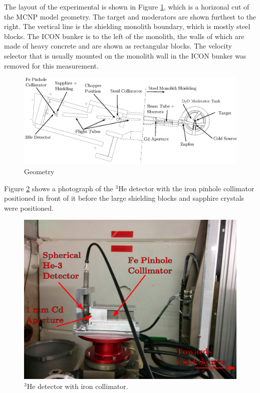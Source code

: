 \documentclass[preprint,12pt]{elsarticle}
\begin{document}
The layout of the experimental is shown in Figure \ref{fig:geom}, which is a horizonal cut of the MCNP model geometry.  The target and moderators are shown furthest to the right.  The vertical line is the shielding monolith boundary, which is mostly steel blocks.  The ICON bunker is to the left of the monolith, the walls of which are made of heavy concrete and are shown as rectangular blocks.  The velocity selector that is usually mounted on the monolith wall in the ICON bunker was removed for this measurement.

\begin{figure}[h!] 
  \centering
    \includegraphics[width=\columnwidth]{graphics/geom_bw_labels.eps}
     \caption{Geometry \label{fig:geom} }
\end{figure}

Figure \ref{fig:det} shows a photograph of the $^3$He detector with the iron pinhole collimator positioned in front of it before the large shielding blocks and sapphire crystals were positioned.

\begin{figure}[h!] 
  \centering
    \includegraphics[width=\columnwidth]{graphics/det.eps}
     \caption{$^3$He detector with iron collimator. \label{fig:det}}
\end{figure}
\end{document}
